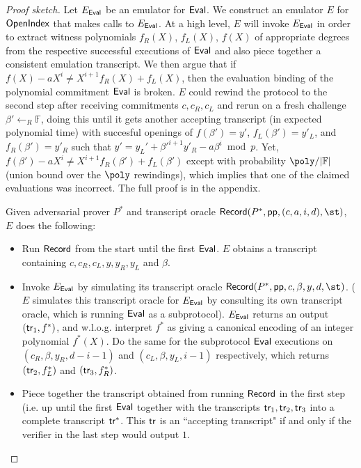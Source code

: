 \begin{proof}[Proof sketch]
Let $E_{\textsf{{Eval}}}$ be an emulator for $\textsf{{Eval}}$. We construct an emulator $E$ for $\textsf{{OpenIndex}}$ that makes calls to $E_{\textsf{{Eval}}}$. At a high level, $E$ will invoke $E_{\textsf{{Eval}}}$ in order to extract witness polynomials $f_R(X)$, $f_L(X)$, $f(X)$ of appropriate degrees from the respective successful executions of $\textsf{{Eval}}$ and also piece together a consistent emulation transcript. We then argue that if $f(X) - a X^i \neq X^{i+1} f_R(X) + f_L(X)$, then the evaluation binding of the polynomial commitment $\textsf{{Eval}}$ is broken. $E$ could rewind the protocol to the second step after receiving commitments $c, c_R, c_L$ and rerun on a fresh challenge $\beta' \leftarrow_R \mathbb{F}$, doing this until it gets another accepting transcript (in expected polynomial time) with succesful openings of $f(\beta') = y'$, $f_L(\beta') = y'_L$, and $f_R(\beta') = y'_R$ such that $y' = y_L' + \beta'^{i+1} y'_R - a \beta^i \bmod p$. Yet, $f(\beta') - a X^i \neq X^{i+1} f_R(\beta') + f_L(\beta')$ except with probability $\poly / |\mathbb{F}|$ (union bound over the $\poly$ rewindings), which implies that one of the claimed evaluations was incorrect. The full proof is in the appendix. 


Given adversarial prover $P^*$ and transcript oracle $\pro{Record}(P^*, \params, (c, a, i, d), \st)$, $E$ does the following: 

\begin{itemize} 
\item Run $\textsf{{Record}}$ from the start until the first $\textsf{{Eval}}$. $E$ obtains a transcript containing $c, c_R, c_L, y, y_R, y_L$ and $\beta$. 

\item Invoke $E_{\textsf{{Eval}}}$ by simulating its transcript oracle $\pro{Record}(P^*, \params, c, \beta, y, d, \st)$. ($E$ simulates this transcript oracle for $E_{\textsf{{Eval}}}$ by consulting its own transcript oracle, which is running $\textsf{{Eval}}$ as a subprotocol). $E_{\textsf{{Eval}}}$ returns an output $(\textsf{{tr}}_1, f^*)$, and w.l.o.g. interpret $f^*$ as giving a canonical encoding of an integer polynomial $f^*(X)$. Do the same for the subprotocol $\textsf{{Eval}}$ executions on $(c_R, \beta, y_R, d - i - 1)$ and $(c_L, \beta, y_L, i-1)$ respectively, which returns $(\textsf{{tr}}_2, f_L^*)$ and $(\textsf{{tr}}_3, f_R^*)$. 

\item Piece together the transcript obtained from running $\textsf{{Record}}$ in the first step (i.e. up until the first $\textsf{{Eval}}$ together with the transcripts $\textsf{{tr}}_1, \textsf{{tr}}_2, \textsf{{tr}}_3$ into a complete transcript $\textsf{{tr}}^*$. This $\textsf{{tr}}$ is an ``accepting transcript" if and only if the verifier in the last step would output $1$. 


\end{itemize}
\end{proof}
